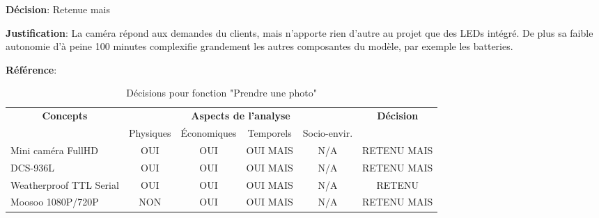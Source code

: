	\textbf{Décision}: Retenue mais
	
	\textbf{Justification}: La caméra répond aux demandes du clients, mais n’apporte rien d’autre au projet que des LEDs intégré. De plus sa faible autonomie d’à peine 100 minutes complexifie grandement les autres composantes du modèle, par exemple les batteries.
	
	\textbf{Référence}: \cite{moosoocam}
	
\begin{table}[!htbp]
	\begin{tabular}{|l|c|c|c|c|c|}
		\hline
		\multicolumn{1}{|c|}{\multirow{2}{*}{\textbf{Concepts}}} & \multicolumn{4}{c|}{\textbf{Aspects de l'analyse}} & \multirow{2}{*}{\textbf{Décision}} \\ \cline{2-5}
		\multicolumn{1}{|c|}{}                                   & Physiques & Économiques & Temporels & Socio-envir. &                                    \\ \hline
		Mini caméra FullHD                                                  & OUI       & OUI         & OUI MAIS      & N/A          & RETENU MAIS                           \\ \hline
		DCS-936L                                                 & OUI       & OUI         & OUI MAIS       & N/A	& RETENU MAIS                             \\ \hline
		Weatherproof TTL Serial                                                & OUI       & OUI         & OUI MAIS       & N/A          & RETENU                             \\ \hline
		Moosoo 1080P/720P                                                 & NON       & OUI         & OUI MAIS       & N/A          & RETENU MAIS	        \\ \hline
	\end{tabular}
	\caption{Décisions pour fonction "Prendre une photo"}
\end{table}


